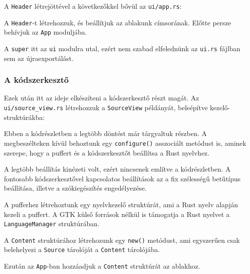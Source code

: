 A \texttt{Header} létrejöttével a következőkkel bővül az \texttt{ui/app.rs}:



A \texttt{Header}-t létrehozzuk, és beállítjuk az ablakunk címsorának.
Előtte persze behívjuk az \texttt{App} moduljába.

A \texttt{super} itt az \texttt{ui} modulra utal, ezért nem szabad elfelednünk az \texttt{ui.rs}
fájlban sem az újraexportálást.



\subsubsection{A kódszerkesztő}

Ezek után itt az ideje elkészíteni a kódszerkesztő részt magát.
Az \verb+ui/source_view.rs+ létrehozzuk a \texttt{SourceView} példányát,
beleépítve kezelő-struktúrákba:



Ebben a kódrészletben a legtöbb döntést már tárgyaltuk  részben.
A megbeszélteken kívül behoztunk egy \texttt{configure()} asszociált metódust is,
aminek szerepe, hogy a puffert és a kódszerkesztőt beállítsa a Rust nyelvhez.

A legtöbb beállítás kinézeti volt, ezért nincsenek említve a kódrészletben.
A fontosabb kódszerkesztővel kapcsolatos beállítások az a fix szélességű betűtípus beállítása,
illetve a szókiegészítés engedélyezése.

A pufferhez létrehoztunk egy nyelvkezelő struktúrát, ami a Rust nyelv alapján kezeli a puffert.
A GTK külső források nélkül is támogatja a Rust nyelvet a \texttt{LanguageManager} struktúrában.

A \texttt{Content} struktúrához létrehozunk egy \texttt{new()} metódust, ami egyszerűen csak
belehelyezi a \texttt{Source} tárolóját a \texttt{Content} tárolójába.

Ezután az \texttt{App}-ban hozzáadjuk a \texttt{Content} struktúrát az ablakhoz.




